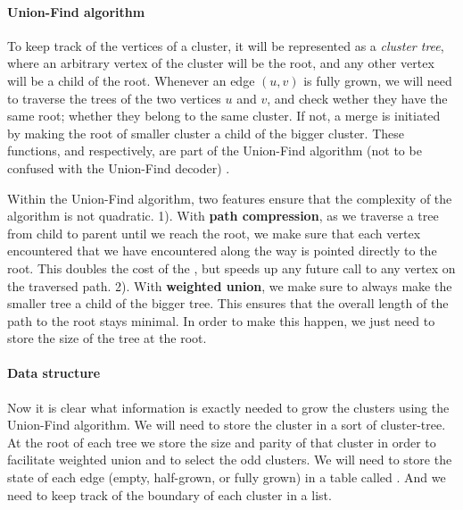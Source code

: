 \paragraph{Union-Find algorithm}


To keep track of the vertices of a cluster, it will be represented as a \emph{cluster tree}, where an arbitrary vertex of the cluster will be the root, and any other vertex will be a child of the root. Whenever an edge $(u,v)$ is fully grown, we will need to traverse the trees of the two vertices $u$ and $v$, and check wether they have the same root; whether they belong to the same cluster. If not, a merge is initiated by making the root of smaller cluster a child of the bigger cluster. These functions,  and  respectively, are part of the Union-Find algorithm (not to be confused with the Union-Find decoder) \cite{tarjan}.


Within the Union-Find algorithm, two features ensure that the complexity of the algorithm is not quadratic. 1). With \textbf{path compression}, as we traverse a tree from child to parent until we reach the root, we make sure that each vertex encountered that we have encountered along the way is pointed directly to the root. This doubles the cost of the , but speeds up any future call to any vertex on the traversed path. 2). With \textbf{weighted union}, we make sure to always make the smaller tree a child of the bigger tree. This ensures that the overall length of the path to the root stays minimal. In order to make this happen, we just need to store the size of the tree at the root.

\paragraph{Data structure}
Now it is clear what information is exactly needed to grow the clusters using the Union-Find algorithm. We will need to store the cluster in a sort of cluster-tree. At the root of each tree we store the size and parity of that cluster in order to facilitate weighted union and to select the odd clusters. We will need to store the state of each edge (empty, half-grown, or fully grown) in a table called . And we need to keep track of the boundary of each cluster in a  list.

